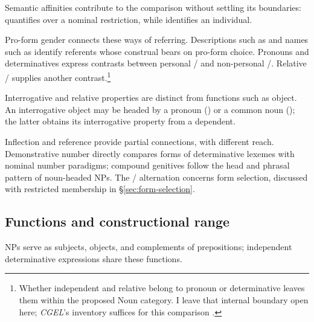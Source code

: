 \documentclass[12pt]{article}
\begin{document}
Semantic affinities contribute to the comparison without settling its boundaries:  quantifies over a nominal restriction, while  identifies an individual.

Pro-form gender \citep{reynolds2025proformgender} connects these ways of referring. Descriptions such as  and names such as  identify referents whose construal bears on pro-form choice. Pronouns and determinatives express contrasts between personal / and non-personal /. Relative / supplies another contrast.\footnote{Whether independent  and relative  belong to pronoun or determinative leaves them within the proposed Noun category. I leave that internal boundary open here; \textit{CGEL}'s inventory suffices for this comparison \citep[397--399]{huddleston2002}.}

Interrogative and relative properties are distinct from functions such as object. An interrogative object may be headed by a pronoun () or a common noun (); the latter obtains its interrogative property from a dependent.

Inflection and reference provide partial connections, with different reach. Demonstrative number directly compares forms of determinative lexemes with nominal number paradigms; compound genitives follow the head and phrasal pattern of noun-headed NPs. The /\allowbreak{} alternation concerns form selection, discussed with restricted membership in §\ref{sec:form-selection}.

\subsection{Functions and constructional range}\label{sec:independent}

NPs serve as subjects, objects, and complements of prepositions; independent determinative expressions share these functions.
\end{document}
